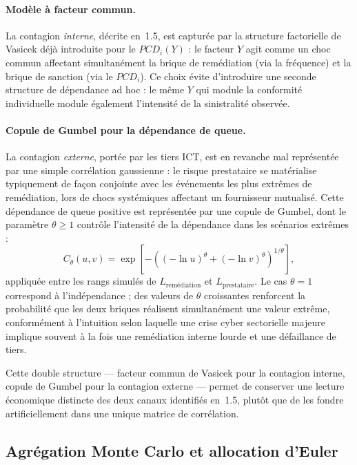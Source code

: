 \documentclass[11pt,a4paper]{article}
\theoremstyle{navystyle}
\theoremstyle{navydef}
\begin{document}
\paragraph{Modèle à facteur commun.} La contagion \emph{interne}, décrite
en~1.5, est capturée par la structure factorielle de Vasicek déjà introduite
pour le $PCD_i(Y)$ : le facteur $Y$ agit comme un choc commun
affectant simultanément la brique de remédiation (via la fréquence) et la
brique de sanction (via le $PCD_i$). Ce choix évite d'introduire une seconde
structure de dépendance ad hoc : le même $Y$ qui module la conformité
individuelle module également l'intensité de la sinistralité observée.

\paragraph{Copule de Gumbel pour la dépendance de queue.} La contagion
\emph{externe}, portée par les tiers ICT, est en revanche mal représentée
par une simple corrélation gaussienne : le risque prestataire se matérialise
typiquement de façon conjointe avec les événements les plus extrêmes de
remédiation, lors de chocs systémiques affectant un fournisseur mutualisé.
Cette dépendance de queue positive est représentée par une copule de
Gumbel, dont le paramètre $\theta \geq 1$ contrôle l'intensité de la
dépendance dans les scénarios extrêmes :
\begin{equation}
C_\theta(u,v) = \exp\!\left[-\left((-\ln u)^\theta + (-\ln v)^\theta\right)^{1/\theta}\right],
\end{equation}
appliquée entre les rangs simulés de $L_{\text{remédiation}}$ et
$L_{\text{prestataire}}$. Le cas $\theta = 1$ correspond à l'indépendance ; des
valeurs de $\theta$ croissantes renforcent la probabilité que les deux briques
réalisent simultanément une valeur extrême, conformément à l'intuition
selon laquelle une crise cyber sectorielle majeure implique souvent à la
fois une remédiation interne lourde et une défaillance de tiers.

Cette double structure --- facteur commun de Vasicek pour la contagion
interne, copule de Gumbel pour la contagion externe --- permet de conserver
une lecture économique distincte des deux canaux identifiés en~1.5, plutôt
que de les fondre artificiellement dans une unique matrice de corrélation.

\subsection{Agrégation Monte Carlo et allocation d'Euler}
\end{document}
